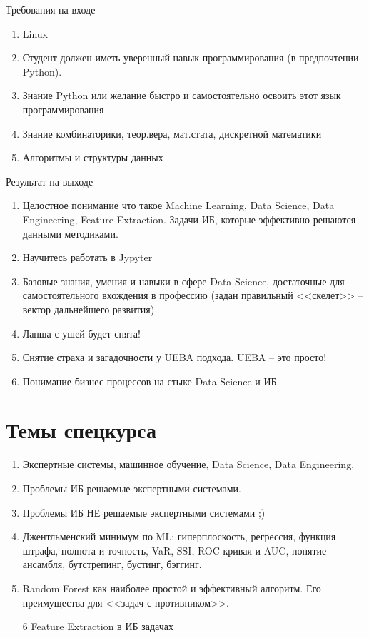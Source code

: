 \documentclass{beamer}
\newcommand{\рис}[1]{рис.\ref{#1}}
\newcommand{\Рис}[1]{Рис.\ref{#1}}
\newcommand{\таблицa}[1]{таблица~№\ref{#1}} %
\newcommand{\таблицы}[1]{таблицы~№\ref{#1}} %
\newcommand{\таблице}[1]{таблице~№\ref{#1}} %
\newcommand{\таблицу}[1]{таблицу~№\ref{#1}} %
\newcommand{\таблицей}[1]{таблицей~№\ref{#1}} %
\newcommand{\Таблицa}[1]{Таблица~№\ref{#1}} %
\newcommand{\Таблицы}[1]{Таблицы~№\ref{#1}} %
\newcommand{\Таблице}[1]{Таблице~№\ref{#1}} %
\newcommand{\Таблицу}[1]{Таблицу~№\ref{#1}} %
\newcommand{\Таблицей}[1]{Таблицей~№\ref{#1}} %
\begin{document}
  \begin{frame}{Требования на входе}
  \begin{enumerate}
  	\item Linux
  	\item Студент должен иметь уверенный навык программирования
  	(в предпочтении Python).
  	\item Знание Python или желание быстро и самостоятельно освоить этот 
  	язык программирования
  	\item Знание комбинаторики, теор.вера, мат.стата, дискретной математики
  	\item Алгоритмы и структуры данных
  \end{enumerate}
  \end{frame}

   \begin{frame}{Результат на выходе}
   \begin{enumerate}
     \item Целостное понимание что такое 
     Machine Learning, 
     Data Science, 
     Data Engineering, 
     Feature Extraction.
     Задачи ИБ, которые эффективно решаются данными методиками.
     \item Научитесь работать в Jypyter
     \item Базовые знания, умения и навыки 
     в сфере Data Science,
     достаточные для самостоятельного вхождения в профессию
     (задан правильный <<скелет>> -- вектор дальнейшего развития)
     \item Лапша с ушей будет снята!
     \item Снятие страха и загадочности у UEBA подхода. 
     UEBA -- это просто!
     \item Понимание бизнес-процессов на стыке
     Data Science и ИБ.
   \end{enumerate}
   \end{frame}

  \section{Темы спецкурса}\label{section:topics}
  
  \begin{frame}
	\begin{enumerate}
	\item Экспертные системы, машинное обучение, Data Science, Data Engineering.
	\item Проблемы ИБ решаемые экспертными системами.
	\item Проблемы ИБ НЕ решаемые экспертными системами ;)
	\item Джентльменский минимум по ML: гиперплоскость, регрессия, функция штрафа, полнота и точность, VaR, SSI, ROC-кривая и AUC, понятие ансамбля, бутстрепинг, бустинг, бэггинг.
	\item Random Forest как наиболее простой и эффективный алгоритм. Его преимущества для 
	<<задач с противником>>.
	\item[6] Feature Extraction в ИБ задачах
	\end{enumerate}
\end{frame}
\end{document}
